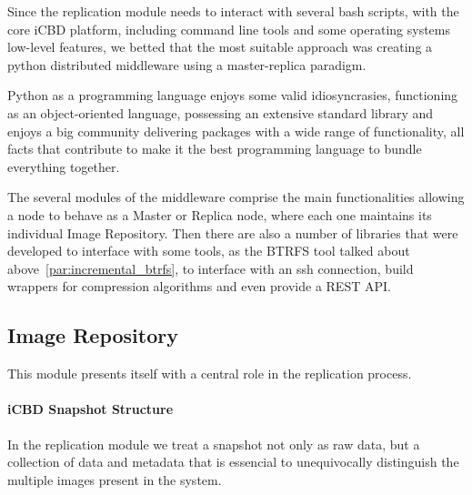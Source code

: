Since the replication module needs to interact with several bash scripts, with the core iCBD platform, including command line tools and some operating systems low-level features, we betted that the most suitable approach was creating a python distributed middleware using a master-replica paradigm.

Python as a programming language enjoys some valid idiosyncrasies, functioning as an object-oriented language, possessing an extensive standard library and enjoys a big community delivering packages with a wide range of functionality, all facts that contribute to make it the best programming language to bundle everything together.

The several modules of the middleware comprise the main functionalities allowing a node to behave as a Master or Replica node, where each one maintains its individual Image Repository. Then there are also a number of libraries that were developed to interface with some tools, as the BTRFS tool talked about above~\ref{par:incremental_btrfs}, to interface with an ssh connection, build wrappers for compression algorithms and even provide a REST API.

\subsection{Image Repository}
\label{sub:rep_image_repo}

This module presents itself with a central role in the replication process.

\paragraph{iCBD Snapshot Structure}
\label{par:icbd_snapshot}

In the replication module we treat a snapshot not only as raw data, but a collection of data and metadata that is essencial to unequivocally distinguish the multiple images present in the system. 


